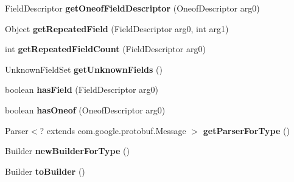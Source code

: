 \begin{DoxyCompactItemize}
Field\+Descriptor {\bfseries get\+Oneof\+Field\+Descriptor} (Oneof\+Descriptor arg0)
\item 
\mbox{\label{classcom_1_1mysql_1_1cj_1_1protocol_1_1x_1_1_x_message_a942085f6643a35b8431217a5ff67f79e}} 
Object {\bfseries get\+Repeated\+Field} (Field\+Descriptor arg0, int arg1)
\item 
\mbox{\label{classcom_1_1mysql_1_1cj_1_1protocol_1_1x_1_1_x_message_a17049fc01e514cb0dff7dee015479bdb}} 
int {\bfseries get\+Repeated\+Field\+Count} (Field\+Descriptor arg0)
\item 
\mbox{\label{classcom_1_1mysql_1_1cj_1_1protocol_1_1x_1_1_x_message_addce81146ac67391234d3aa7a96e617c}} 
Unknown\+Field\+Set {\bfseries get\+Unknown\+Fields} ()
\item 
\mbox{\label{classcom_1_1mysql_1_1cj_1_1protocol_1_1x_1_1_x_message_a6d06d4e5a726dc803135bdb5b2c6649b}} 
boolean {\bfseries has\+Field} (Field\+Descriptor arg0)
\item 
\mbox{\label{classcom_1_1mysql_1_1cj_1_1protocol_1_1x_1_1_x_message_a7db076193101ff9fc72bd16ba6c78d43}} 
boolean {\bfseries has\+Oneof} (Oneof\+Descriptor arg0)
\item 
\mbox{\label{classcom_1_1mysql_1_1cj_1_1protocol_1_1x_1_1_x_message_a47c091a8f4c35c61a341b55fb8228fe8}} 
Parser$<$? extends com.\+google.\+protobuf.\+Message $>$ {\bfseries get\+Parser\+For\+Type} ()
\item 
\mbox{\label{classcom_1_1mysql_1_1cj_1_1protocol_1_1x_1_1_x_message_a14c6b1b4ae6e209068c8389afe35b94b}} 
Builder {\bfseries new\+Builder\+For\+Type} ()
\item 
\mbox{\label{classcom_1_1mysql_1_1cj_1_1protocol_1_1x_1_1_x_message_ae30a12fd79b089e083d950c944c57b92}} 
Builder {\bfseries to\+Builder} ()
\end{DoxyCompactItemize}



